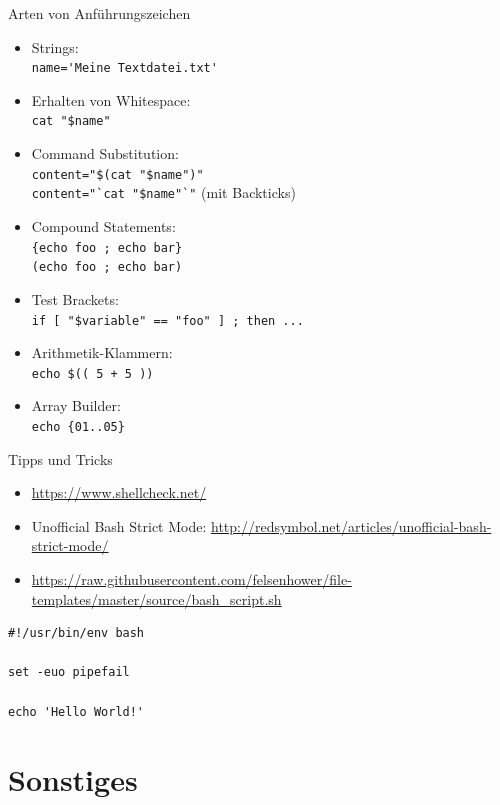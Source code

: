 \documentclass[compress]{beamer}
\begin{document}
\begin{frame}[fragile]{Arten von Anführungszeichen}
\vspace*{-2.5mm}
\small
\begin{itemize}
\item Strings:\\
\verb+name='Meine Textdatei.txt'+
\item Erhalten von Whitespace:\\
\verb+cat "$name"+
\item Command Substitution:\\
\verb+content="$(cat "$name")"+\\
\verb+content="`cat "$name"`"+ (mit Backticks)
\item Compound Statements:\\
\verb+{echo foo ; echo bar}+\\
\verb+(echo foo ; echo bar)+
\item Test Brackets:\\
\verb+if [ "$variable" == "foo" ] ; then ...+
\item Arithmetik-Klammern:\\
\verb|echo $(( 5 + 5 ))|
\item Array Builder:\\
\verb+echo {01..05}+
\end{itemize}
\end{frame}

\begin{frame}[fragile]{Tipps und Tricks}
\begin{itemize}
\item \url{https://www.shellcheck.net/}
\item Unofficial Bash Strict Mode: \url{http://redsymbol.net/articles/unofficial-bash-strict-mode/}
\item \url{https://raw.githubusercontent.com/felsenhower/file-templates/master/source/bash_script.sh}
\end{itemize}

\vspace*{5mm}

\begin{verbatim}
#!/usr/bin/env bash

set -euo pipefail

echo 'Hello World!'
\end{verbatim}
\end{frame}

\section{Sonstiges}
\end{document}
